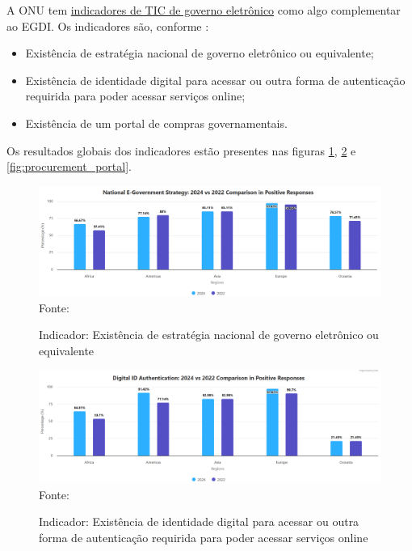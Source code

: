 A ONU tem \href{https://publicadministration.un.org/egovkb/en-us/Data/ICT-in-government}{indicadores de TIC de governo eletrônico} como algo complementar ao EGDI. Os indicadores são, conforme \cite{ONU_ICT_in_government_indicators}:

\begin{itemize}
	\item Existência de estratégia nacional de governo eletrônico ou equivalente;
	\item Existência de identidade digital para acessar ou outra forma de autenticação requirida para poder acessar serviços online;
	\item Existência de um portal de compras governamentais.
\end{itemize}

Os resultados globais dos indicadores estão presentes nas figuras \ref{fig:national_government_strategy}, \ref{fig:national_identity} e \ref{fig:procurement_portal}.

\begin{figure}[H]
	\centering
	\caption{Indicador: Existência de estratégia nacional de governo eletrônico ou equivalente}
	\includegraphics[width=1\linewidth]{figuras/ict_in_government/national_government_strategy}
	\label{fig:national_government_strategy}
	\footnotesize{Fonte: \cite{ONU_ICT_in_government_indicators}}
\end{figure}

\begin{figure}[H]
	\centering
	\caption{Indicador: Existência de identidade digital para acessar ou outra forma de autenticação requirida para poder acessar serviços online}
	\includegraphics[width=1\linewidth]{figuras/ict_in_government/digital_identity}
	\label{fig:national_identity}
	\footnotesize{Fonte: \cite{ONU_ICT_in_government_indicators}}
\end{figure}


